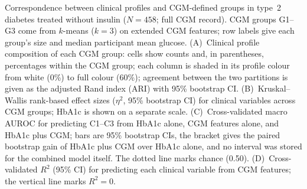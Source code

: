 \caption{Correspondence between clinical profiles and CGM-defined groups in type~2 diabetes treated without insulin ($N=458$; full CGM record). CGM groups G1--G3 come from $k$-means ($k=3$) on extended CGM features; row labels give each group's size and median participant mean glucose. (A)~Clinical profile composition of each CGM group: cells show counts and, in parentheses, percentages within the CGM group; each column is shaded in its profile colour from white (0\%) to full colour (60\%); agreement between the two partitions is given as the adjusted Rand index (ARI) with 95\% bootstrap CI. (B)~Kruskal--Wallis rank-based effect sizes ($\eta^2$, 95\% bootstrap CI) for clinical variables across CGM groups; HbA1c is shown on a separate scale. (C)~Cross-validated macro AUROC for predicting C1--C3 from HbA1c alone, CGM features alone, and HbA1c plus CGM; bars are 95\% bootstrap CIs, the bracket gives the paired bootstrap gain of HbA1c plus CGM over HbA1c alone, and no interval was stored for the combined model itself. The dotted line marks chance (0.50). (D)~Cross-validated $R^2$ (95\% CI) for predicting each clinical variable from CGM features; the vertical line marks $R^2=0$.}
